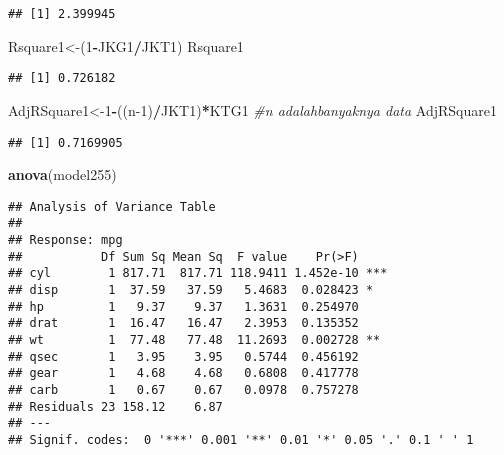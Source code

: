 \documentclass[
]{article}
\newenvironment{Shaded}{\begin{snugshade}}{\end{snugshade}}
\newcommand{\CommentTok}[1]{\textcolor[rgb]{0.56,0.35,0.01}{\textit{#1}}}
\newcommand{\DecValTok}[1]{\textcolor[rgb]{0.00,0.00,0.81}{#1}}
\newcommand{\FunctionTok}[1]{\textcolor[rgb]{0.13,0.29,0.53}{\textbf{#1}}}
\newcommand{\NormalTok}[1]{#1}
\newcommand{\OtherTok}[1]{\textcolor[rgb]{0.56,0.35,0.01}{#1}}
\newcommand{\SpecialCharTok}[1]{\textcolor[rgb]{0.81,0.36,0.00}{\textbf{#1}}}
\begin{document}
\begin{Shaded}
\end{Shaded}

\begin{verbatim}
## [1] 2.399945
\end{verbatim}

\begin{Shaded}
\begin{Highlighting}[]
\NormalTok{Rsquare1}\OtherTok{\textless{}{-}}\NormalTok{(}\DecValTok{1}\SpecialCharTok{{-}}\NormalTok{JKG1}\SpecialCharTok{/}\NormalTok{JKT1)}
\NormalTok{Rsquare1}
\end{Highlighting}
\end{Shaded}

\begin{verbatim}
## [1] 0.726182
\end{verbatim}

\begin{Shaded}
\begin{Highlighting}[]
\NormalTok{AdjRSquare1}\OtherTok{\textless{}{-}}\DecValTok{1}\SpecialCharTok{{-}}\NormalTok{((n}\DecValTok{{-}1}\NormalTok{)}\SpecialCharTok{/}\NormalTok{JKT1)}\SpecialCharTok{*}\NormalTok{KTG1 }\CommentTok{\#n adalahbanyaknya data}
\NormalTok{AdjRSquare1}
\end{Highlighting}
\end{Shaded}

\begin{verbatim}
## [1] 0.7169905
\end{verbatim}

\begin{Shaded}
\begin{Highlighting}[]
\FunctionTok{anova}\NormalTok{(model255)}
\end{Highlighting}
\end{Shaded}

\begin{verbatim}
## Analysis of Variance Table
## 
## Response: mpg
##           Df Sum Sq Mean Sq  F value    Pr(>F)    
## cyl        1 817.71  817.71 118.9411 1.452e-10 ***
## disp       1  37.59   37.59   5.4683  0.028423 *  
## hp         1   9.37    9.37   1.3631  0.254970    
## drat       1  16.47   16.47   2.3953  0.135352    
## wt         1  77.48   77.48  11.2693  0.002728 ** 
## qsec       1   3.95    3.95   0.5744  0.456192    
## gear       1   4.68    4.68   0.6808  0.417778    
## carb       1   0.67    0.67   0.0978  0.757278    
## Residuals 23 158.12    6.87                       
## ---
## Signif. codes:  0 '***' 0.001 '**' 0.01 '*' 0.05 '.' 0.1 ' ' 1
\end{verbatim}
\end{document}
